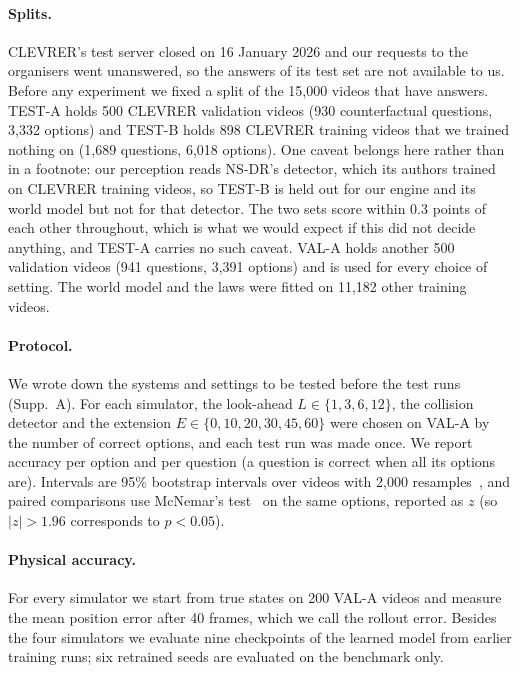 \IfFileExists{TMLR}{\documentclass[10pt]{article}}%
\begin{document}
\paragraph{Splits.}
CLEVRER's test server closed on 16 January 2026 and our requests to the organisers went unanswered, so the answers of its test set are not available to us.
Before any experiment we fixed a split of the 15,000 videos that have answers.
TEST-A holds 500 CLEVRER validation videos (930 counterfactual questions, 3,332 options) and TEST-B holds 898 CLEVRER training videos that we trained nothing on (1,689 questions, 6,018 options).
One caveat belongs here rather than in a footnote: our perception reads NS-DR's detector, which its authors trained on CLEVRER training videos, so TEST-B is held out for our engine and its world model but not for that detector.
The two sets score within 0.3 points of each other throughout, which is what we would expect if this did not decide anything, and TEST-A carries no such caveat.
VAL-A holds another 500 validation videos (941 questions, 3,391 options) and is used for every choice of setting.
The world model and the laws were fitted on 11,182 other training videos.

\paragraph{Protocol.}
We wrote down the systems and settings to be tested before the test runs (Supp.~A).
For each simulator, the look-ahead $L \in \{1,3,6,12\}$, the collision detector and the extension $E \in \{0,10,20,30,45,60\}$ were chosen on VAL-A by the number of correct options, and each test run was made once.
We report accuracy per option and per question (a question is correct when all its options are).
Intervals are 95\% bootstrap intervals over videos with 2,000 resamples~\cite{efron1993bootstrap}, and paired comparisons use McNemar's test~\cite{mcnemar1947note} on the same options, reported as $z$ (so $|z|>1.96$ corresponds to $p<0.05$).

\paragraph{Physical accuracy.}
For every simulator we start from true states on 200 VAL-A videos and measure the mean position error after 40 frames, which we call the rollout error.
Besides the four simulators we evaluate nine checkpoints of the learned model from earlier training runs; six retrained seeds are evaluated on the benchmark only.
\end{document}

